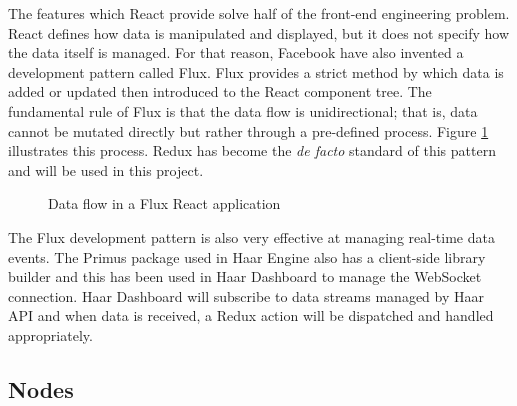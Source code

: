      The features which React provide solve half of the front-end engineering problem. React defines how data is manipulated and displayed, but it does not specify how the data itself is managed. For that reason, Facebook have also invented a development pattern called Flux. Flux provides a strict method by which data is added or updated then introduced to the React component tree. The fundamental rule of Flux is that the data flow is unidirectional; that is, data cannot be mutated directly but rather through a pre-defined process. Figure \ref{figure:flux-flow} illustrates this process. Redux has become the \textit{de facto} standard of this pattern and will be used in this project.

      \begin{figure}
        \centering
      \caption{Data flow in a Flux React application}\label{figure:flux-flow}
    \end{figure}

    The Flux development pattern is also very effective at managing real-time data events. The Primus package used in Haar Engine also has a client-side library builder and this has been used in Haar Dashboard to manage the WebSocket connection. Haar Dashboard will subscribe to data streams managed by Haar API and when data is received, a Redux action will be dispatched and handled appropriately.

    \subsection{Nodes}

